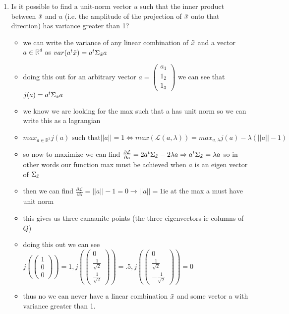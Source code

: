 \documentclass[12pt,twoside]{article}
\begin{document}
\begin{enumerate}
\begin{enumerate}
\item Is it possible to find a unit-norm vector $u$ such that the inner product between $\tilde{  x }$ and $u$ (i.e. the amplitude of the projection of $\tilde{  x }$ onto that direction) has variance greater than 1?
\begin{itemize}
  \color{blue}
  \item we can write the variance of any linear combination of $\Tilde{x}$ and a vector $a\in \mathbb{R}^{d}$ as $var(a^t\Tilde{x})=a^t\Sigma_{\Tilde{x}}a$
  \item doing this out for an arbitrary vector $a=\begin{pmatrix}
    a_1\\1_2\\1_3
  \end{pmatrix}$ we can see that $j(a)=a^t\Sigma_{\Tilde{x}}a$
  \item we know we are looking for the max such that a has unit norm so we can write this as a lagrangian 
  \item $max_{a\in \mathbb{R}^{3}}j(a) \text{ such that} ||a||=1\iff max(\mathcal{L}(a,\lambda ))=max_{a,\lambda}j(a)-\lambda(||a||-1)$
  \item so now to maximize we can find $\frac{\partial \mathcal{L}}{\partial a}=2a^t\Sigma_{\Tilde{x}}-2\lambda a\Rightarrow a^t\Sigma_{\Tilde{x}}=\lambda a$ so in other words our function max must be achieved when $a$ is an eigen vector of $\Sigma_{\Tilde{x}}$  
  \item then we can find  $\frac{\partial \mathcal{L}}{\partial \lambda}=||a||-1=0\rightarrow ||a||=1$ie at the max a must have unit norm
  \item this gives us three canaanite points (the three eigenvectors ie columns of $Q$)
  \item  doing this out we can see $j(\begin{pmatrix}
    1\\0\\0
  \end{pmatrix})=1,j(\begin{pmatrix}
    0\\\frac{1}{\sqrt{2}}\\\frac{1}{\sqrt{2}}
  \end{pmatrix})=.5,j(\begin{pmatrix}
    0\\\frac{1}{\sqrt{2}}\\-\frac{1}{\sqrt{2}}
  \end{pmatrix})=0$
  \item thus no we can never have a linear combination $\Tilde{x}$ and some vector a with variance greater than 1. 



\end{itemize}
\end{enumerate}
\end{enumerate}
\end{document}
